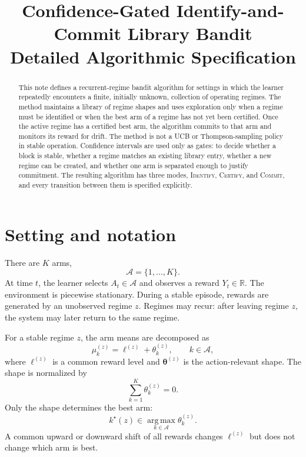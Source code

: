 \documentclass[11pt]{article}
\title{Confidence-Gated Identify-and-Commit Library Bandit\\\large Detailed Algorithmic Specification}
\author{}
\date{}
\newcommand{\A}{\mathcal A}
\newcommand{\R}{\mathbb R}
\newcommand{\argmax}{\operatorname*{arg\,max}}
\newcommand{\ID}{\textsc{Identify}}
\newcommand{\CERT}{\textsc{Certify}}
\newcommand{\COMMIT}{\textsc{Commit}}
\begin{document}
\maketitle

\begin{abstract}
This note defines a recurrent-regime bandit algorithm for settings in which the learner repeatedly encounters a finite, initially unknown, collection of operating regimes. The method maintains a library of regime shapes and uses exploration only when a regime must be identified or when the best arm of a regime has not yet been certified. Once the active regime has a certified best arm, the algorithm commits to that arm and monitors its reward for drift. The method is not a UCB or Thompson-sampling policy in stable operation. Confidence intervals are used only as gates: to decide whether a block is stable, whether a regime matches an existing library entry, whether a new regime can be created, and whether one arm is separated enough to justify commitment. The resulting algorithm has three modes, \ID, \CERT, and \COMMIT, and every transition between them is specified explicitly.
\end{abstract}

\section{Setting and notation}

There are $K$ arms,
\begin{equation}
    \A=\{1,\ldots,K\}.
\end{equation}
At time $t$, the learner selects $A_t\in\A$ and observes a reward $Y_t\in\R$. The environment is piecewise stationary. During a stable episode, rewards are generated by an unobserved regime $z$. Regimes may recur: after leaving regime $z$, the system may later return to the same regime.

For a stable regime $z$, the arm means are decomposed as
\begin{equation}
    \mu_k^{(z)}=\ell^{(z)}+\theta_k^{(z)},
    \qquad k\in\A,
    \label{eq:level-shape}
\end{equation}
where $\ell^{(z)}$ is a common reward level and $\bm\theta^{(z)}$ is the action-relevant shape. The shape is normalized by
\begin{equation}
    \sum_{k=1}^K\theta_k^{(z)}=0.
\end{equation}
Only the shape determines the best arm:
\begin{equation}
    k^\star(z)\in\argmax_{k\in\A}\theta_k^{(z)}.
\end{equation}
A common upward or downward shift of all rewards changes $\ell^{(z)}$ but does not change which arm is best.
\end{document}
